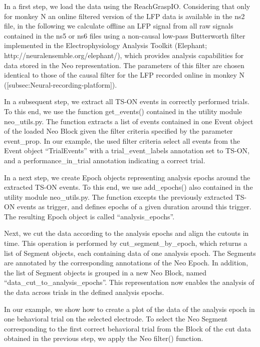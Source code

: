 In a first step, we load the data using the ReachGraspIO. Considering that only for monkey N an online filtered version of the LFP data is available in the ns2 file, in the following we calculate offline an LFP signal from all raw signals contained in the ns5 or ns6 files using a non-causal low-pass Butterworth filter implemented in the Electrophysiology Analysis Toolkit (Elephant; http://neuralensemble.org/elephant/), which provides analysis capabilities for data stored in the Neo representation. The parameters of this filter are chosen identical to those of the causal filter for the LFP recorded online in monkey N ([subsec:Neural-recording-platform]).

In a subsequent step, we extract all TS-ON events in correctly performed trials. To this end, we use the function get\_events() contained in the utility module neo\_utils.py. The function extracts a list of events contained in one Event object of the loaded Neo Block given the filter criteria specified by the parameter event\_prop. In our example, the used filter criteria select all events from the Event object “TrialEvents” with a trial\_event\_labels annotation set to TS-ON, and a performance\_in\_trial annotation indicating a correct trial.

In a next step, we create Epoch objects representing analysis epochs around the extracted TS-ON events. To this end, we use add\_epochs() also contained in the utility module neo\_utils.py. The function excepts the previously extracted TS-ON events as trigger, and defines epochs of a given duration around this trigger. The resulting Epoch object is called “analysis\_epochs”. 

Next, we cut the data according to the analysis epochs and align the cutouts in time. This operation is performed by cut\_segment\_by\_epoch, which returns a list of Segment objects, each containing data of one analysis epoch. The Segments are annotated by the corresponding annotations of the Neo Epoch. In addition, the list of Segment objects is grouped in a new Neo Block, named “data\_cut\_to\_analysis\_epochs”. This representation now enables the analysis of the data across trials in the defined analysis epochs. 

In our example, we show how to create a plot of the data of the analysis epoch in one behavioral trial on the selected electrode. To select the Neo Segment corresponding to the first correct behavioral trial from the Block of the cut data obtained in the previous step, we apply the Neo filter() function. 

